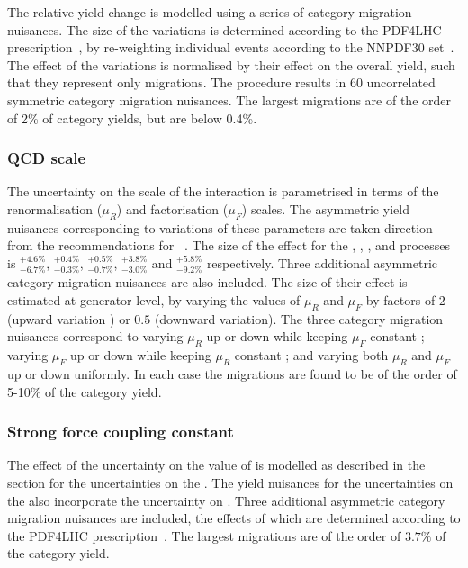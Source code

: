 The relative yield change is modelled using a series of category migration nuisances. The size of the variations is determined according to the PDF4LHC prescription~\cite{Demartin:2010er}, by re-weighting individual events according to the NNPDF30 \PDF set~\cite{Carrazza:2015aoa}. The effect of the variations is normalised by their effect on the overall yield, such that they represent only migrations. The procedure results in 60 uncorrelated symmetric category migration nuisances. The largest migrations are of the order of 2\% of category yields, but are below 0.4\%.

\subsubsection{QCD scale}
The uncertainty on the scale of the \QCD interaction is parametrised in terms of the renormalisation ($\mu_{R}$) and factorisation ($\mu_{F}$) scales. The asymmetric yield nuisances corresponding to variations of these parameters are taken direction from the \LHCHXSWG recommendations for \crosssection\s~\cite{LHCHXSWGYR4}. The size of the effect for the \ggH, \VBF, \WH, \ZH and \ttH processes is $^{+4.6\%}_{-6.7\%}$, $^{+0.4\%}_{-0.3\%}$, $^{+0.5\%}_{-0.7\%}$, $^{+3.8\%}_{-3.0\%}$ and $^{+5.8\%}_{-9.2\%}$ respectively. Three additional asymmetric category migration nuisances are also included. The size of their effect is estimated at generator level, by varying the values of $\mu_{R}$ and $\mu_{F}$ by factors of $2$ (upward variation ) or $0.5$ (downward variation). The three category migration nuisances correspond to varying $\mu_{R}$ up or down while keeping $\mu_{F}$ constant ; varying $\mu_{F}$ up or down while keeping $\mu_{R}$ constant ; and varying both $\mu_{R}$ and $\mu_{F}$ up or down uniformly. In each case the migrations are found to be of the order of 5-10\% of the category yield.

\subsubsection{Strong force coupling constant}
The effect of the uncertainty on the value of \alphaS is modelled as described in the section for the uncertainties on the \PDF\s. The yield nuisances for the uncertainties on the \PDF\s also incorporate the uncertainty on \alphaS. Three additional asymmetric category migration nuisances are included, the effects of which are determined according to the PDF4LHC prescription~\cite{Demartin:2010er}. The largest migrations are of the order of $3.7\%$ of the category yield. 


